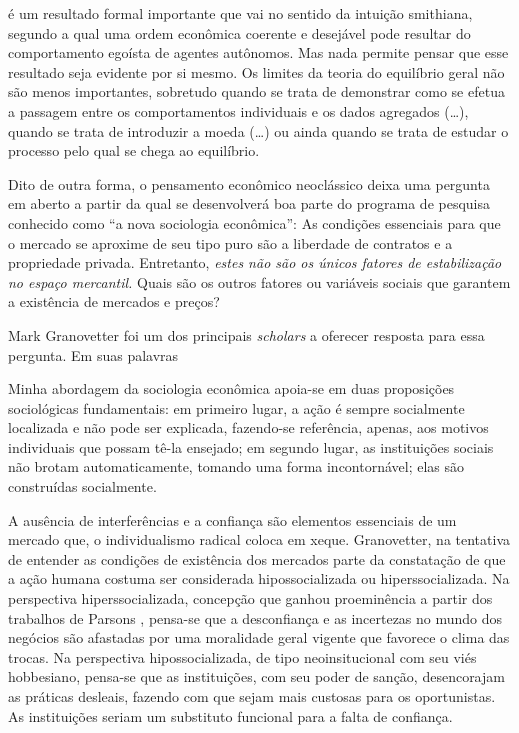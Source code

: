 \documentclass[a4paper, 12pt, openright, oneside, german, french, english, brazil]{abntex2}
\begin{document}
	\begin{citacao}
		é um resultado formal importante que vai no sentido da intuição smithiana, segundo a qual uma ordem econômica coerente e desejável pode resultar do comportamento egoísta de agentes autônomos. Mas nada permite pensar que esse resultado seja evidente por si mesmo. Os limites da teoria do equilíbrio geral não são menos importantes, sobretudo quando se trata de demonstrar como se efetua a passagem entre os comportamentos individuais e os dados agregados (\ldots), quando se trata de introduzir a moeda (\ldots) ou ainda quando se trata de estudar o processo pelo qual se chega ao equilíbrio. \cite[p. 38-9]{steiner2006}
	\end{citacao}
	
	Dito de outra forma, o pensamento econômico neoclássico deixa uma pergunta em aberto a partir da qual se desenvolverá boa parte do programa de pesquisa conhecido como ``a nova sociologia econômica'': As condições essenciais para que o mercado se aproxime de seu tipo puro são a liberdade de contratos e a propriedade privada. Entretanto, \textit{estes não são os únicos fatores de estabilização no espaço mercantil.} Quais são os outros fatores ou variáveis sociais que garantem a existência de mercados e preços?
	
	Mark Granovetter foi um dos principais \textit{scholars} a oferecer resposta para essa pergunta. Em suas palavras
	
	\begin{citacao}
		Minha abordagem da sociologia econômica apoia-se em duas proposições sociológicas fundamentais: em primeiro lugar, a ação é sempre socialmente localizada e não pode ser explicada, fazendo-se referência, apenas, aos motivos individuais que possam tê-la ensejado; em segundo lugar, as instituições sociais não brotam automaticamente, tomando uma forma incontornável; elas são construídas socialmente. 
	\end{citacao}
	
	A ausência de interferências e a confiança são elementos essenciais de um mercado que, o individualismo radical coloca em xeque. Granovetter, na tentativa de entender as condições de existência dos mercados parte da constatação de que a ação humana costuma ser considerada hipossocializada ou hiperssocializada. Na perspectiva hiperssocializada, concepção que ganhou proeminência a partir dos trabalhos de Parsons \cite{granovetter2007acao}, pensa-se que a desconfiança e as incertezas no mundo dos negócios são afastadas por uma moralidade geral vigente que favorece o clima das trocas. Na perspectiva hipossocializada, de tipo neoinsitucional com seu viés hobbesiano, pensa-se que as instituições, com seu poder de sanção, desencorajam as práticas desleais, fazendo com que sejam mais custosas para os oportunistas. As instituições seriam um substituto funcional para a falta de confiança.
	
\end{document}

